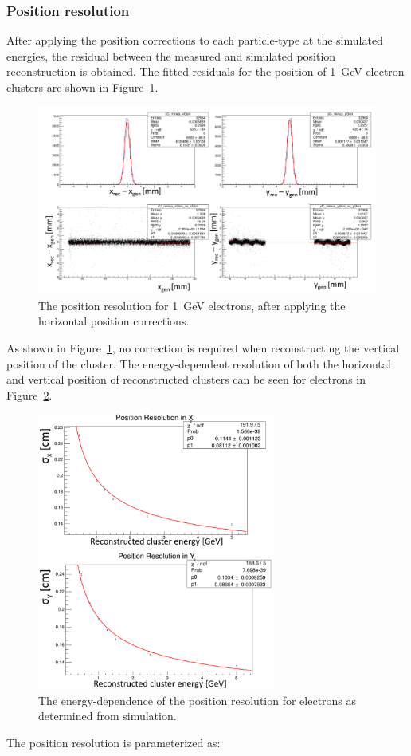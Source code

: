 \subsubsection{Position resolution}

After applying the position corrections to each particle-type at the simulated energies, the residual between the measured and simulated position reconstruction is obtained. The fitted residuals for the position of 1~GeV electron clusters are shown in Figure~\ref{Figure:corrPosnsFits}.
\begin{figure}[htb]
  \centering
      \includegraphics[width=1.0\textwidth]{pics/performance/corrPosnsFits.png}
  \caption[Position resolution for 1~GeV electrons]{The position resolution for 1~GeV electrons, after applying the horizontal position corrections.}
  \label{Figure:corrPosnsFits}
\end{figure}
As shown in Figure~\ref{Figure:corrPosnsFits}, no correction is required when reconstructing the vertical position of the cluster. The energy-dependent resolution of both the horizontal and vertical position of reconstructed clusters can be seen for electrons in Figure~\ref{Figure:emPosnResn}. 
\begin{figure}[htb]
  \centering
      \includegraphics[width=0.7\textwidth]{pics/performance/emPosnResn.png}
  \caption[Energy-dependent position resolution for electrons]{The energy-dependence of the position resolution for electrons as determined from simulation.}
  \label{Figure:emPosnResn}
\end{figure}
The position resolution is parameterized as:
 
